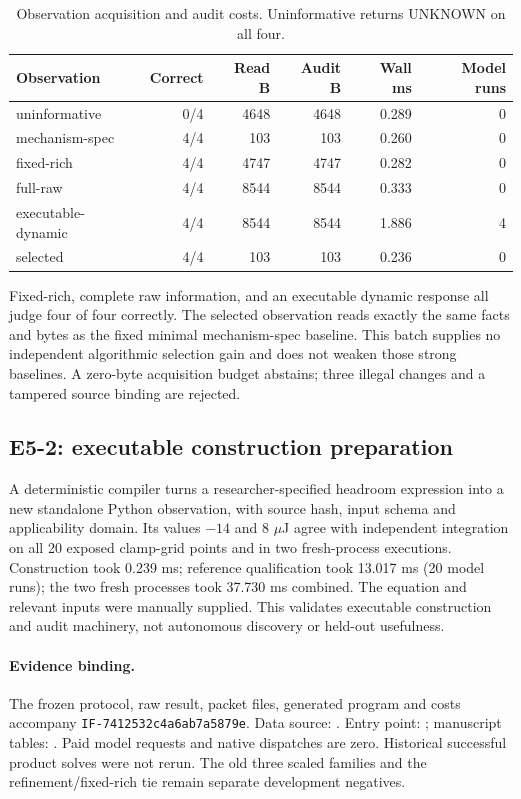 \begin{table}[ht]
\centering\small
\begin{tabular}{lrrrrr}
\toprule
Observation & Correct & Read B & Audit B & Wall ms & Model runs \\
\midrule
uninformative & 0/4 & 4648 & 4648 & 0.289 & 0 \\
mechanism-spec & 4/4 & 103 & 103 & 0.260 & 0 \\
fixed-rich & 4/4 & 4747 & 4747 & 0.282 & 0 \\
full-raw & 4/4 & 8544 & 8544 & 0.333 & 0 \\
executable-dynamic & 4/4 & 8544 & 8544 & 1.886 & 4 \\
selected & 4/4 & 103 & 103 & 0.236 & 0 \\
\bottomrule
\end{tabular}
\caption{Observation acquisition and audit costs. Uninformative returns UNKNOWN on all four.}
\label{tab:costs}
\end{table}

Fixed-rich, complete raw information, and an executable dynamic response all judge four of four correctly. The selected observation reads exactly the same facts and bytes as the fixed minimal mechanism-spec baseline. This batch supplies no independent algorithmic selection gain and does not weaken those strong baselines. A zero-byte acquisition budget abstains; three illegal changes and a tampered source binding are rejected.

\subsection{E5-2: executable construction preparation}
A deterministic compiler turns a researcher-specified headroom expression into a new standalone Python observation, with source hash, input schema and applicability domain. Its values $-14$ and $8$ $\mu$J agree with independent integration on all 20 exposed clamp-grid points and in two fresh-process executions. Construction took 0.239 ms; reference qualification took 13.017 ms (20 model runs); the two fresh processes took 37.730 ms combined. The equation and relevant inputs were manually supplied. This validates executable construction and audit machinery, not autonomous discovery or held-out usefulness.

\paragraph{Evidence binding.}
The frozen protocol, raw result, packet files, generated program and costs accompany \texttt{IF-7412532c4a6ab7a5879e}. Data source: . Entry point: ; manuscript tables: . Paid model requests and native dispatches are zero. Historical successful product solves were not rerun. The old three scaled families and the refinement/fixed-rich tie remain separate development negatives.
